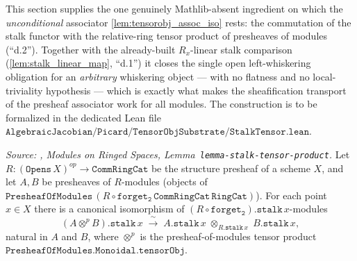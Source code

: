 This section supplies the one genuinely Mathlib-absent ingredient on which the
\emph{unconditional} associator \cref{lem:tensorobj_assoc_iso} rests: the commutation
of the stalk functor with the relative-ring tensor product of presheaves of modules
(``d.2''). Together with the already-built \(R_x\)-linear stalk comparison
(\cref{lem:stalk_linear_map}, ``d.1'') it closes the single open left-whiskering
obligation for an \emph{arbitrary} whiskering object --- with no flatness and no
local-triviality hypothesis --- which is exactly what makes the sheafification
transport of the presheaf associator work for all modules. The construction is to be
formalized in the dedicated Lean file
\(\mathtt{AlgebraicJacobian/Picard/TensorObjSubstrate/StalkTensor.lean}\).

\begin{lemma}\leanok
  \label{lem:stalk_tensor_commutation}
  \textit{Source: \cite{stacks-project}, Modules on Ringed Spaces,
  Lemma~\texttt{lemma-stalk-tensor-product}.}
  Let \(R : (\mathtt{Opens}\,X)^{op} \to \mathtt{CommRingCat}\) be the structure
  presheaf of a scheme \(X\), and let \(A, B\) be presheaves of
  \(R\)-modules (objects of \(\mathtt{PresheafOfModules}\,(R \circ
  \mathtt{forget_2}\,\mathtt{CommRingCat}\,\mathtt{RingCat})\)). For each point
  \(x \in X\) there is a canonical isomorphism of \((R \circ
  \mathtt{forget_2}).\mathtt{stalk}\,x\)-modules
  \[
    (A \otimes^{p} B).\mathtt{stalk}\,x
      \;\xrightarrow{\ \sim\ }\;
    A.\mathtt{stalk}\,x \;\otimes_{R.\mathtt{stalk}\,x}\; B.\mathtt{stalk}\,x,
  \]
  natural in \(A\) and \(B\), where \(\otimes^{p}\) is the presheaf-of-modules tensor
  product \(\mathtt{PresheafOfModules.Monoidal.tensorObj}\).
\end{lemma}

